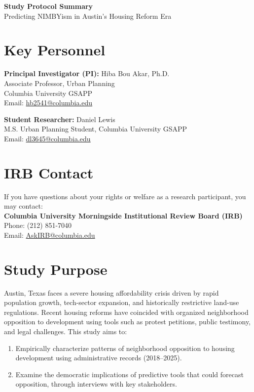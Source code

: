 \documentclass[10pt, letterpaper]{article}
\begin{document}
\begin{center}
    {\Large \textbf{\color{columbiablue_official} Study Protocol Summary}} \\[0.3em]
    {\large Predicting NIMBYism in Austin’s Housing Reform Era}
\end{center}

\section*{Key Personnel}
\noindent \textbf{Principal Investigator (PI):} Hiba Bou Akar, Ph.D. \\
Associate Professor, Urban Planning \\
Columbia University GSAPP \\
Email: \href{mailto:hb2541@columbia.edu}{hb2541@columbia.edu}

\vspace{0.5em}
\noindent \textbf{Student Researcher:} Daniel Lewis \\
M.S. Urban Planning Student, Columbia University GSAPP \\
Email: \href{mailto:dl3645@columbia.edu}{dl3645@columbia.edu}

\section*{IRB Contact}
If you have questions about your rights or welfare as a research participant, you may contact: \\
\textbf{Columbia University Morningside Institutional Review Board (IRB)} \\
Phone: (212) 851-7040 \\
Email: \href{mailto:AskIRB@columbia.edu}{AskIRB@columbia.edu}

\section*{Study Purpose}
Austin, Texas faces a severe housing affordability crisis driven by rapid population growth, tech-sector expansion, and historically restrictive land-use regulations. Recent housing reforms have coincided with organized neighborhood opposition to development using tools such as protest petitions, public testimony, and legal challenges. This study aims to:
\begin{enumerate}[leftmargin=*, noitemsep]
    \item Empirically characterize patterns of neighborhood opposition to housing development using administrative records (2018–2025).
    \item Examine the democratic implications of predictive tools that could forecast opposition, through interviews with key stakeholders.
\end{enumerate}
\end{document}
